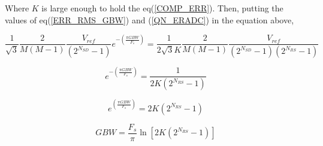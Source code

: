 Where $K$ is large enough to hold the eq(\ref{COMP_ERR}). Then, putting the values of eq(\ref{ERR_RMS_GBW}) and (\ref{QN_ERADC}) in the equation above,

 \begin{equation*}
    \frac{1}{\sqrt{3}}\frac{2}{M(M-1)}\frac{V_{ref}}{\left(2^{N_{SD}}-1\right)}e^{-\left(\frac{\pi GBW}{F_s}\right)}  = \frac{1}{2\sqrt{3}K}\frac{2}{M(M-1)}\frac{V_{ref}}{\left(2^{N_{SD}}-1\right)\left(2^{N_{RS}}-1\right)}
\end{equation*}

 \begin{equation*}
    e^{-\left(\frac{\pi GBW}{F_s}\right)}  = \frac{1}{2K\left(2^{N_{RS}}-1\right)}
\end{equation*}

 \begin{equation*}
    e^{\left(\frac{\pi GBW}{F_s}\right)}  = 2K\left(2^{N_{RS}}-1\right)
\end{equation*}

\begin{equation}\label{eq:GBW}
    GBW = \frac{F_s}{\pi} \ln{\left[2K\left(2^{N_{RS}}-1\right)\right]}
\end{equation}

\begin{table}[]
\centering
{}
\caption{Comparison between the Simulated SNR and the SNR on the modeled characteristic (in dB) for different values of $K$ as a function of calculated Finite GBW (in MHz)}
\label{SIM_CALC_COMP_GBW}
\end{table}



